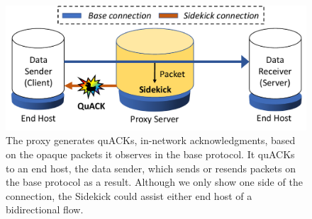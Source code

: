 \begin{figure}[t]
	\centering
	\includegraphics[width=\linewidth]{sidekick-paper/figures/sc_protocol.pdf}
\caption{The proxy generates quACKs, in-network acknowledgments, based on
the opaque packets it observes in the base protocol. It quACKs to an end
host, the data sender, which sends or resends packets on the base protocol as a result.
Although we only show one side of the connection, the Sidekick could assist
either end host of a bidirectional flow.
\vspace{-0.4cm}
}
\label{fig:sc-protocols}
\end{figure}
